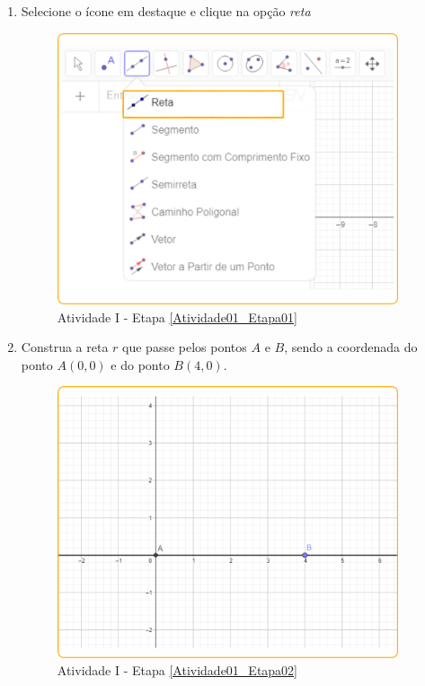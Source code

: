 \documentclass[11pt,a4paper]{article}
\begin{document}
\begin{enumerate}[{Etapa} 1.]
\item Selecione o ícone em destaque e clique na opção {\it reta}\label{Atividade01_Etapa01}

\begin{figure}[H]
    \centering
    \includegraphics[height=8cm]{Figuras/T01_Elemento02.png}
    \caption{Atividade I - Etapa \ref{Atividade01_Etapa01}}
    \label{Atividade01_Etapa01_Imagem}
\end{figure}

\item Construa a reta $r$ que passe pelos pontos $A$ e $B$, sendo a coordenada do ponto $A (0,0)$ e do ponto $B (4,0)$. \label{Atividade01_Etapa02}

\begin{figure}[H]
    \centering
    \includegraphics[height=8cm]{Figuras/T01_Atividade01_Fig01.png}
\caption{Atividade I - Etapa \ref{Atividade01_Etapa02}}
    \label{Atividade01_Etapa02_Imagem}
\end{figure}


\end{enumerate}
\end{document}
